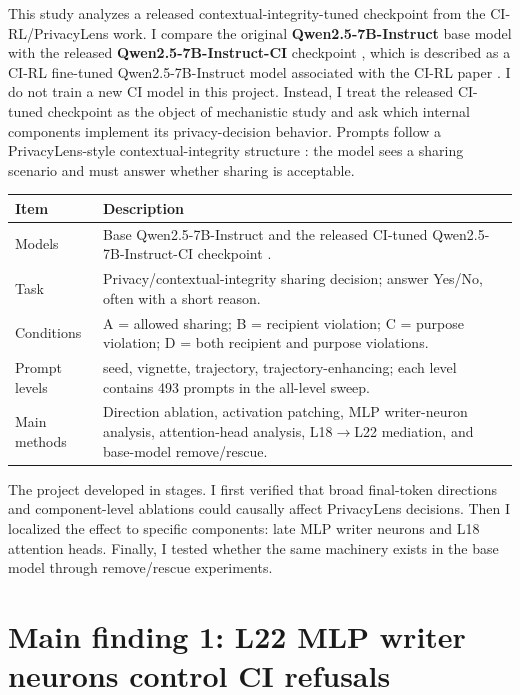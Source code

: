 \documentclass[10pt]{article}
\begin{document}
This study analyzes a released contextual-integrity-tuned checkpoint from the CI-RL/PrivacyLens work. I compare the original \textbf{Qwen2.5-7B-Instruct} base model \cite{qwen25base} with the released \textbf{Qwen2.5-7B-Instruct-CI} checkpoint \cite{qwen25ci}, which is described as a CI-RL fine-tuned Qwen2.5-7B-Instruct model associated with the CI-RL paper \cite{lan2025ci}. I do not train a new CI model in this project. Instead, I treat the released CI-tuned checkpoint as the object of mechanistic study and ask which internal components implement its privacy-decision behavior. Prompts follow a PrivacyLens-style contextual-integrity structure \cite{shao2024privacylens}: the model sees a sharing scenario and must answer whether sharing is acceptable.

\begin{center}
\small
\begin{tabularx}{0.98\linewidth}{@{}lX@{}}
\toprule
\textbf{Item} & \textbf{Description} \\
\midrule
Models & Base Qwen2.5-7B-Instruct \cite{qwen25base} and the released CI-tuned Qwen2.5-7B-Instruct-CI checkpoint \cite{qwen25ci}. \\
Task & Privacy/contextual-integrity sharing decision; answer Yes/No, often with a short reason. \\
Conditions & A = allowed sharing; B = recipient violation; C = purpose violation; D = both recipient and purpose violations. \\
Prompt levels & seed, vignette, trajectory, trajectory-enhancing; each level contains 493 prompts in the all-level sweep. \\
Main methods & Direction ablation, activation patching, MLP writer-neuron analysis, attention-head analysis, L18$\rightarrow$L22 mediation, and base-model remove/rescue. \\
\bottomrule
\end{tabularx}
\end{center}

The project developed in stages. I first verified that broad final-token directions and component-level ablations could causally affect PrivacyLens decisions. Then I localized the effect to specific components: late MLP writer neurons and L18 attention heads. Finally, I tested whether the same machinery exists in the base model through remove/rescue experiments.

\section{Main finding 1: L22 MLP writer neurons control CI refusals}
\end{document}
